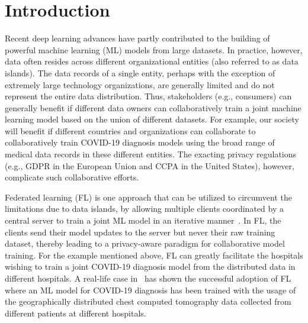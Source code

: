 \documentclass[10pt,journal,compsoc]{IEEEtran}
\begin{document}
\maketitle

\IEEEdisplaynontitleabstractindextext
%
\IEEEpeerreviewmaketitle


\section{Introduction}\label{sec::01}
Recent deep learning advances have partly contributed to the building of powerful machine learning (ML) models from large datasets. In practice, however, data often resides across different organizational entities (also referred to as data islands). The data records of a single entity, perhaps with the exception of extremely large technology organizations, are generally limited and do not represent the entire data distribution. Thus, stakeholders (e.g., consumers) can generally benefit if different data owners can collaboratively train a joint machine learning model based on the union of different datasets. For example, our society will benefit if different countries and organizations can collaborate to collaboratively train COVID-19 diagnosis models using the broad range of medical data records in these different entities. The exacting privacy regulations (e.g., GDPR \cite{mantelero2013eu} in the European Union and CCPA \cite{de2018guide} in the United States), however, complicate such collaborative efforts. 

Federated learning (FL) is one approach that can be utilized to circumvent the limitations due to data islands, by allowing multiple clients coordinated by a central server to train a joint ML model in an iterative manner~\cite{mcmahan2017communication,smith2017federated,caldas2018leaf,bonawitz2019towards}. In FL, the clients send their model updates to the server but never their raw training dataset, thereby leading to a privacy-aware paradigm for collaborative model training. For the example mentioned above, FL can greatly facilitate the hospitals wishing to train a joint COVID-19 diagnosis model from the distributed data in different hospitals. A real-life case in~\cite{xu2020collaborative} has shown the successful adoption of FL where an ML model for COVID-19 diagnosis has been trained with the usage of the geographically distributed chest computed tomography data collected from different patients at different hospitals.
\end{document}
